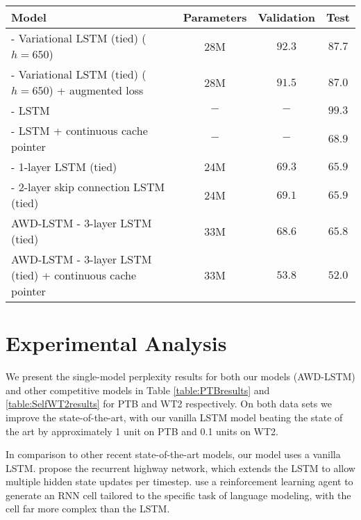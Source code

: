 \documentclass{article}
\begin{document}
\begin{table*}
\center
\begin{tabular}{l|ccc}
\toprule
\bf Model & \bf Parameters & \bf Validation &  \bf Test \\
\midrule
\citet{Inan2016} - Variational LSTM  (tied) ($h=650$) & 28M & $92.3$ & $87.7$ \\
\citet{Inan2016} - Variational LSTM  (tied) ($h=650$) + augmented loss & 28M & $91.5$ & $87.0$ \\
\citet{Grave2016} - LSTM & $-$ & $-$ & $99.3$ \\
\citet{Grave2016} - LSTM + continuous cache pointer & $-$ & $-$ & $68.9$ \\
\citet{Melis2017} - 1-layer LSTM (tied) & 24M & $69.3$ & $65.9$ \\
\citet{Melis2017} - 2-layer skip connection LSTM (tied) & 24M & $69.1$ & $65.9$ \\
\midrule
AWD-LSTM - 3-layer LSTM (tied) & 33M & $68.6$ & $65.8$ \\
\midrule
AWD-LSTM - 3-layer LSTM (tied) + continuous cache pointer & 33M & $53.8$ & $52.0$ \\
\bottomrule
\end{tabular}
\caption{Single model perplexity over WikiText-2.
Models noting \textit{tied} use weight tying on the embedding and softmax weights.
Our model, AWD-LSTM, stands for ASGD Weight-Dropped LSTM.
}
\label{table:SelfWT2results}
\end{table*}

\section{Experimental Analysis}

We present the single-model perplexity results for both our models (AWD-LSTM) and other competitive models in Table \ref{table:PTBresults} and \ref{table:SelfWT2results} for PTB and WT2 respectively.
On both data sets we improve the state-of-the-art, with our vanilla LSTM model beating the state of the art by approximately 1 unit on PTB and 0.1 units on WT2.

In comparison to other recent state-of-the-art models, our model uses a vanilla LSTM.
\citet{Zilly2016} propose the recurrent highway network, which extends the LSTM to allow multiple hidden state updates per timestep.
\citet{Zoph2016} use a reinforcement learning agent to generate an RNN cell tailored to the specific task of language modeling, with the cell far more complex than the LSTM.
\end{document}
